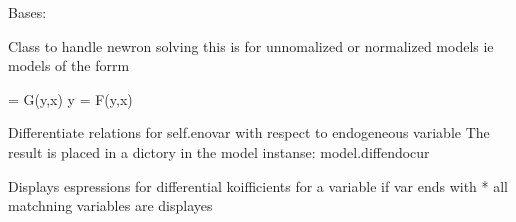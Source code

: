 \documentclass[letterpaper,10pt,english]{sphinxmanual}
\begin{document}

\begin{fulllineitems}
\label{\detokenize{core/modelnewton:modelnewton.newton_diff}}
\pysigstartsignatures
{}
\pysigstopsignatures
\sphinxAtStartPar
Bases: 

\sphinxAtStartPar
Class to handle newron solving
this is for un\sphinxhyphen{}nomalized or normalized models ie models of the forrm

 = G(y,x)
y = F(y,x)

\begin{fulllineitems}
\label{\detokenize{core/modelnewton:modelnewton.newton_diff.modeldiff}}
\pysigstartsignatures
{}
\pysigstopsignatures
\sphinxAtStartPar
Differentiate relations for self.enovar with respect to endogeneous variable
The result is placed in a dictory in the model instanse: model.diffendocur

\end{fulllineitems}


\begin{fulllineitems}
\label{\detokenize{core/modelnewton:modelnewton.newton_diff.show_diff}}
\pysigstartsignatures
{}
\pysigstopsignatures
\sphinxAtStartPar
Displays espressions for differential koifficients for a variable
if var ends with * all matchning variables are displayes


\end{fulllineitems}
\end{fulllineitems}
\end{document}
